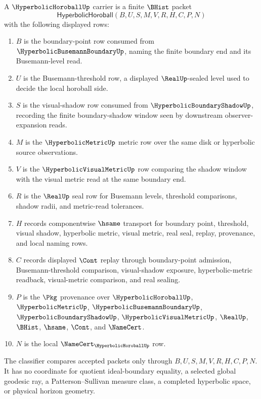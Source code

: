 \begin{definition}
\label{def:hyperbolic-horoball-carrier}
A $\HyperbolicHoroballUp$ carrier is a finite $\BHist$ packet
$$
\mathsf{HyperbolicHoroball}(B,U,S,M,V,R,H,C,P,N)
$$
with the following displayed rows:
\begin{enumerate}
\item $B$ is the boundary-point row consumed from $\HyperbolicBusemannBoundaryUp$, naming the finite boundary end and its Busemann-level read.
\item $U$ is the Busemann-threshold row, a displayed $\RealUp$-sealed level used to decide the local horoball side.
\item $S$ is the visual-shadow row consumed from $\HyperbolicBoundaryShadowUp$, recording the finite boundary-shadow window seen by downstream observer-expansion reads.
\item $M$ is the $\HyperbolicMetricUp$ metric row over the same disk or hyperbolic source observations.
\item $V$ is the $\HyperbolicVisualMetricUp$ row comparing the shadow window with the visual metric read at the same boundary end.
\item $R$ is the $\RealUp$ seal row for Busemann levels, threshold comparisons, shadow radii, and metric-read tolerances.
\item $H$ records componentwise $\hsame$ transport for boundary point, threshold, visual shadow, hyperbolic metric, visual metric, real seal, replay, provenance, and local naming rows.
\item $C$ records displayed $\Cont$ replay through boundary-point admission, Busemann-threshold comparison, visual-shadow exposure, hyperbolic-metric readback, visual-metric comparison, and real sealing.
\item $P$ is the $\Pkg$ provenance over $\HyperbolicHoroballUp$, $\HyperbolicMetricUp$, $\HyperbolicBusemannBoundaryUp$, $\HyperbolicBoundaryShadowUp$, $\HyperbolicVisualMetricUp$, $\RealUp$, $\BHist$, $\hsame$, $\Cont$, and $\NameCert$.
\item $N$ is the local $\NameCert_{\HyperbolicHoroballUp}$ row.
\end{enumerate}
The classifier compares accepted packets only through $B,U,S,M,V,R,H,C,P,N$. It has no coordinate for quotient ideal-boundary equality, a selected global geodesic ray, a Patterson--Sullivan measure class, a completed hyperbolic space, or physical horizon geometry.
\end{definition}

